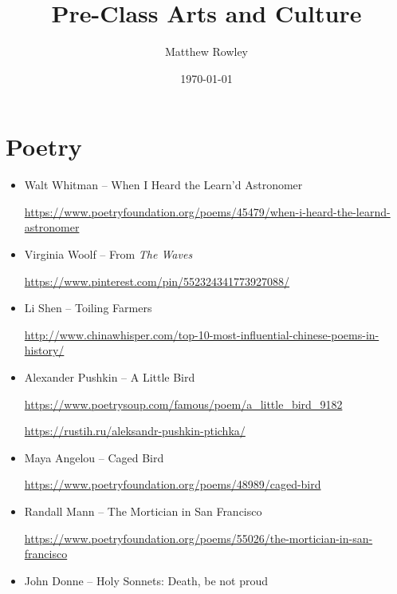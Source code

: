 \documentclass[12pt, openany, letterpaper]{memoir}
\begin{document}
\title{Pre-Class Arts and Culture}
\author{Matthew Rowley}
\date{\today}
\mainmatter
\maketitle
\chapter{Poetry}
\begin{itemize}
	\item Walt Whitman -- When I Heard the Learn’d Astronomer 
	
	 \hyperref[https://www.poetryfoundation.org/poems/45479/when-i-heard-the-learnd-astronomer]{https://www.poetryfoundation.org/poems/45479/when-i-heard-the-learnd-astronomer}
	 
	\item Virginia Woolf -- From \emph{The Waves}
	
	\hyperref[https://www.pinterest.com/pin/552324341773927088/]{https://www.pinterest.com/pin/552324341773927088/}
	
	\item Li Shen -- Toiling Farmers
	
	\hyperref[http://www.chinawhisper.com/top-10-most-influential-chinese-poems-in-history/]{http://www.chinawhisper.com/top-10-most-influential-chinese-poems-in-history/}
	
	\item Alexander Pushkin -- A Little Bird
	
	\hyperref[https://www.poetrysoup.com/famous/poem/a_little_bird_9182]{https://www.poetrysoup.com/famous/poem/a\_little\_bird\_9182}
	
	\hyperref[https://rustih.ru/aleksandr-pushkin-ptichka/]{https://rustih.ru/aleksandr-pushkin-ptichka/}
	
	\item Maya Angelou -- Caged Bird
	
	\hyperref[https://www.poetryfoundation.org/poems/48989/caged-bird]{https://www.poetryfoundation.org/poems/48989/caged-bird}
	
	\item Randall Mann -- The Mortician in San Francisco
	
	\hyperref[https://www.poetryfoundation.org/poems/55026/the-mortician-in-san-francisco]{https://www.poetryfoundation.org/poems/55026/the-mortician-in-san-francisco}
	
	\item John Donne -- Holy Sonnets: Death, be not proud
	

\end{itemize}
\end{document}
